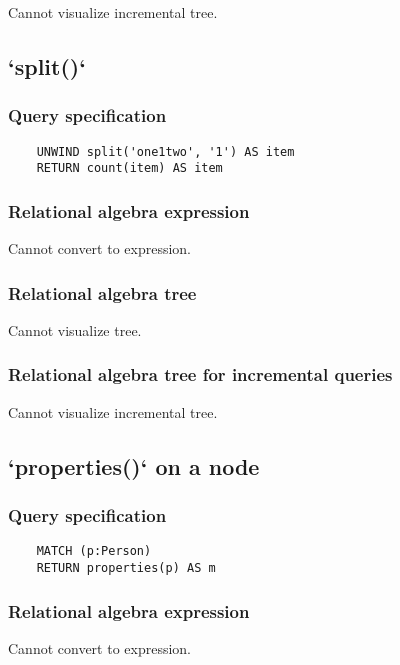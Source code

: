 	Cannot visualize incremental tree.
	\subsection{`split()`}

	\subsubsection*{Query specification}

	\begin{lstlisting}
	UNWIND split('one1two', '1') AS item
	RETURN count(item) AS item
	\end{lstlisting}


	\subsubsection*{Relational algebra expression}

	Cannot convert to expression.

	\subsubsection*{Relational algebra tree}

	Cannot visualize tree.

	\subsubsection*{Relational algebra tree for incremental queries}

	Cannot visualize incremental tree.
	\subsection{`properties()` on a node}

	\subsubsection*{Query specification}

	\begin{lstlisting}
	MATCH (p:Person)
	RETURN properties(p) AS m
	\end{lstlisting}


	\subsubsection*{Relational algebra expression}

	Cannot convert to expression.

